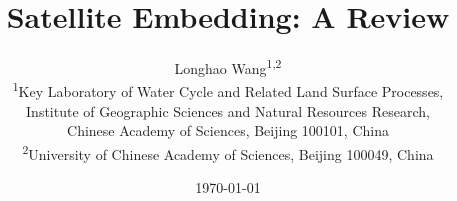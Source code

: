 \documentclass[10pt]{article}
\title{Satellite Embedding: A Review}
\author{Longhao Wang\textsuperscript{1,2}\\
\small \textsuperscript{1}Key Laboratory of Water Cycle and Related Land Surface Processes,\\
\small Institute of Geographic Sciences and Natural Resources Research,\\
\small Chinese Academy of Sciences, Beijing 100101, China\\
\small \textsuperscript{2}University of Chinese Academy of Sciences, Beijing 100049, China}
\date{\today}
\begin{document}
\maketitle

\begin{abstract}

\end{abstract}











\end{document}
